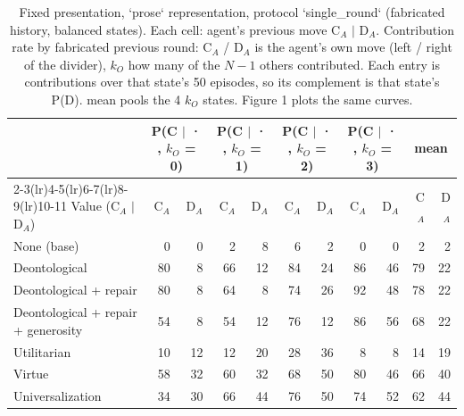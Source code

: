 \begin{table}[t]
\centering
\caption{Fixed presentation, `prose` representation, protocol `single_round` (fabricated history, balanced states). Each cell: agent's previous move C$_A$ $\mid$ D$_A$. Contribution rate by fabricated previous round: C$_A$ / D$_A$ is the agent's own move (left / right of the divider), $k_O$ how many of the $N-1$ others contributed. Each entry is contributions over that state's 50 episodes, so its complement is that state's P(D). mean pools the 4 $k_O$ states. Figure 1 plots the same curves.}
\label{tab:contribution}
\small
\setlength{\tabcolsep}{3.5pt}
\begin{tabular}{lrrrrrrrrrr}
\toprule
 & \multicolumn{2}{c}{P(C $\mid$ · , $k_O$ = 0)} & \multicolumn{2}{c}{P(C $\mid$ · , $k_O$ = 1)} & \multicolumn{2}{c}{P(C $\mid$ · , $k_O$ = 2)} & \multicolumn{2}{c}{P(C $\mid$ · , $k_O$ = 3)} & \multicolumn{2}{c}{mean} \\
\cmidrule(lr){2-3}\cmidrule(lr){4-5}\cmidrule(lr){6-7}\cmidrule(lr){8-9}\cmidrule(lr){10-11}
Value (C$_A$ $\mid$ D$_A$) & C$_A$ & D$_A$ & C$_A$ & D$_A$ & C$_A$ & D$_A$ & C$_A$ & D$_A$ & C$_A$ & D$_A$ \\
\midrule
None (base) & 0 & 0 & 2 & 8 & 6 & 2 & 0 & 0 & 2 & 2 \\
Deontological & 80 & 8 & 66 & 12 & 84 & 24 & 86 & 46 & 79 & 22 \\
Deontological + repair & 80 & 8 & 64 & 8 & 74 & 26 & 92 & 48 & 78 & 22 \\
Deontological + repair + generosity & 54 & 8 & 54 & 12 & 76 & 12 & 86 & 56 & 68 & 22 \\
Utilitarian & 10 & 12 & 12 & 20 & 28 & 36 & 8 & 8 & 14 & 19 \\
Virtue & 58 & 32 & 60 & 32 & 68 & 50 & 80 & 46 & 66 & 40 \\
Universalization & 34 & 30 & 66 & 44 & 76 & 50 & 74 & 52 & 62 & 44 \\
\bottomrule
\end{tabular}
\end{table}
